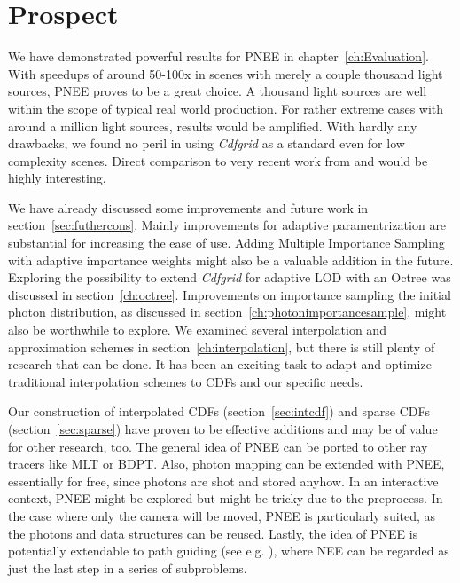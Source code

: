 \chapter{Prospect}
\label{ch:Prospect}

We have demonstrated powerful results for PNEE in chapter~\ref{ch:Evaluation}. With speedups of around 50-100x in scenes with merely a couple thousand light sources, PNEE proves to be a great choice. A thousand light sources are well within the scope of typical real world production. For rather extreme cases with around a million light sources, results would be amplified. With hardly any drawbacks, we found no peril in using \textit{Cdfgrid} as a standard even for low complexity scenes. Direct comparison to very recent work from \textcite{Vevoda:2018:BOR} and \textcite{Estevez} would be highly interesting.

 We have already discussed some improvements and future work in section~\ref{sec:futhercons}. Mainly improvements for adaptive paramentrization are substantial for increasing the ease of use. Adding Multiple Importance Sampling with adaptive importance weights might also be a valuable addition in the future. Exploring the possibility to extend \textit{Cdfgrid} for adaptive LOD with an Octree was discussed in section~\ref{ch:octree}. Improvements on importance sampling the initial photon distribution, as discussed in section~\ref{ch:photonimportancesample}, might also be worthwhile to explore. We examined several interpolation and approximation schemes in section~\ref{ch:interpolation}, but there is still plenty of research that can be done. It has been an exciting task to adapt and optimize traditional interpolation schemes to CDFs and our specific needs. 

Our construction of interpolated CDFs (section~\ref{sec:intcdf}) and sparse CDFs (section~\ref{sec:sparse}) have proven to be effective additions and may be of value for other research, too. The general idea of PNEE can be ported to other ray tracers like MLT or BDPT. Also, photon mapping can be extended with PNEE, essentially for free, since photons are shot and stored anyhow. In an interactive context, PNEE might be explored but might be tricky due to the preprocess. In the case where only the camera will be moved, PNEE is particularly suited, as the photons and data structures can be reused. Lastly, the idea of PNEE is potentially extendable to path guiding (see e.g. \parencite{DBLP:journals/cgf/MullerGN17}), where NEE can be regarded as just the last step in a series of subproblems.
